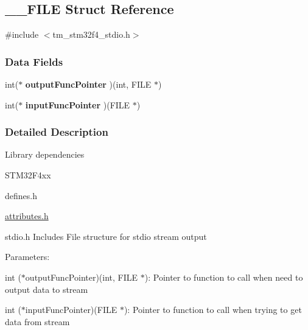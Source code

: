 \hypertarget{struct_____f_i_l_e}{}\subsection{\+\_\+\+\_\+\+F\+I\+L\+E Struct Reference}
\label{struct_____f_i_l_e}


{\ttfamily \#include $<$tm\+\_\+stm32f4\+\_\+stdio.\+h$>$}

\subsubsection*{Data Fields}
\begin{DoxyCompactItemize}
\item 
\hypertarget{struct_____f_i_l_e_ad81c0fb83d2aa881bb1113e5841eb852}{}int($\ast$ {\bfseries output\+Func\+Pointer} )(int, F\+I\+L\+E $\ast$)\label{struct_____f_i_l_e_ad81c0fb83d2aa881bb1113e5841eb852}

\item 
\hypertarget{struct_____f_i_l_e_a2941f6b5a0f2cd5172de8c462fd970f6}{}int($\ast$ {\bfseries input\+Func\+Pointer} )(F\+I\+L\+E $\ast$)\label{struct_____f_i_l_e_a2941f6b5a0f2cd5172de8c462fd970f6}

\end{DoxyCompactItemize}


\subsubsection{Detailed Description}
Library dependencies
\begin{DoxyItemize}
\item S\+T\+M32\+F4xx
\item defines.\+h
\item \hyperlink{attributes_8h_source}{attributes.\+h}
\item stdio.\+h Includes File structure for stdio stream output
\end{DoxyItemize}

Parameters\+:
\begin{DoxyItemize}
\item int ($\ast$output\+Func\+Pointer)(int, F\+I\+L\+E $\ast$)\+: Pointer to function to call when need to output data to stream
\item int ($\ast$input\+Func\+Pointer)(F\+I\+L\+E $\ast$)\+: Pointer to function to call when trying to get data from stream 
\end{DoxyItemize}